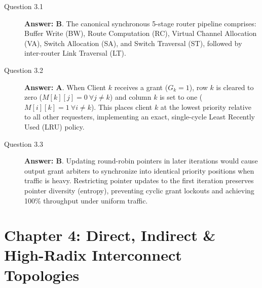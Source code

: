 \begin{description}
    \item[Question 3.1] \textbf{Answer: B}.
    The canonical synchronous 5-stage router pipeline comprises: Buffer Write (BW), Route Computation (RC), Virtual Channel Allocation (VA), Switch Allocation (SA), and Switch Traversal (ST), followed by inter-router Link Traversal (LT).

    \item[Question 3.2] \textbf{Answer: A}.
    When Client $k$ receives a grant ($G_k = 1$), row $k$ is cleared to zero ($M[k][j] = 0\ \forall j \ne k$) and column $k$ is set to one ($M[i][k] = 1\ \forall i \ne k$). This places client $k$ at the lowest priority relative to all other requesters, implementing an exact, single-cycle Least Recently Used (LRU) policy.

    \item[Question 3.3] \textbf{Answer: B}.
    Updating round-robin pointers in later iterations would cause output grant arbiters to synchronize into identical priority positions when traffic is heavy. Restricting pointer updates to the first iteration preserves pointer diversity (entropy), preventing cyclic grant lockouts and achieving 100\% throughput under uniform traffic.
\end{description}

\section*{Chapter 4: Direct, Indirect \& High-Radix Interconnect Topologies}

